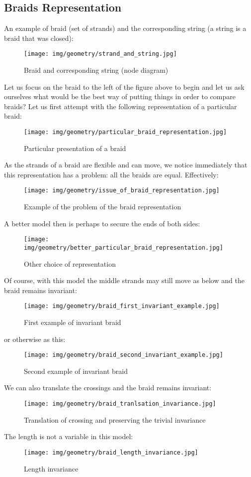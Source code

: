 {		\subsection{Braids Representation}
		An example of braid (set of strands) and the corresponding string (a string is a braid that was closed):
		\begin{figure}[H]
			\centering
			\texttt{[image: img/geometry/strand\_and\_string.jpg]}
			\caption{Braid and corresponding string (node diagram)}
		\end{figure}
		Let us focus on the braid to the left of the figure above to begin and let us ask ourselves what would be the best way of putting things in order to compare braids? Let us first attempt with the following representation of a particular braid:
		\begin{figure}[H]
			\centering
			\texttt{[image: img/geometry/particular\_braid\_representation.jpg]}
			\caption{Particular presentation of a braid}
		\end{figure}
		As the strands of a braid are flexible and can move, we notice immediately that this representation has a problem: all the braids are equal. Effectively:
		\begin{figure}[H]
			\centering
			\texttt{[image: img/geometry/issue\_of\_braid\_representation.jpg]}
			\caption{Example of the problem of the braid representation}
		\end{figure}
		A better model then is perhaps to secure the ends of both sides:
		\begin{figure}[H]
			\centering
			\texttt{[image: img/geometry/better\_particular\_braid\_representation.jpg]}
			\caption{Other choice of representation}
		\end{figure}
		Of course, with this model the middle strands may still move as below and the braid remains invariant:
		\begin{figure}[H]
			\centering
			\texttt{[image: img/geometry/braid\_first\_invariant\_example.jpg]}
			\caption{First example of invariant braid}
		\end{figure}
		or otherwise as this:
		\begin{figure}[H]
			\centering
			\texttt{[image: img/geometry/braid\_second\_invariant\_example.jpg]}
			\caption{Second example of invariant braid}
		\end{figure}
		We can also translate the crossings and the braid remains invariant:
		\begin{figure}[H]
			\centering
			\texttt{[image: img/geometry/braid\_tranlsation\_invariance.jpg]}
			\caption{Translation of crossing and preserving the trivial invariance}
		\end{figure}
		The length is not a variable in this model:
		\begin{figure}[H]
			\centering
			\texttt{[image: img/geometry/braid\_length\_invariance.jpg]}
			\caption{Length invariance}
		\end{figure}
		
}
